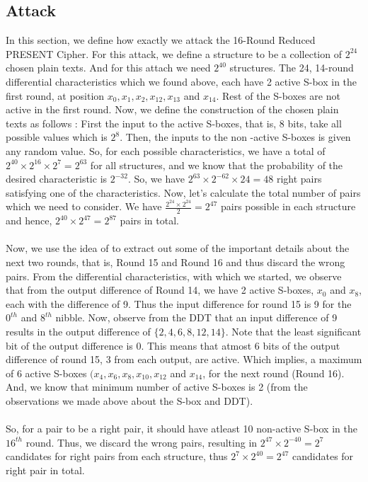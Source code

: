 \documentclass[preprint]{transcrypto}
\begin{document}
\subsection{Attack}
In this section, we define how exactly we attack the 16-Round Reduced PRESENT Cipher. For this attack, we define a structure to be a collection of $2^{24}$ chosen plain texts. And for this attach we need $2^{40}$ structures. The 24, 14-round differential characteristics which we found above, each have 2 active S-box in the first round, at position $x_0,x_1,x_2,x_{12},x_{13}$ and $x_{14}$. Rest of the S-boxes are not active in the first round. Now, we define the construction of the chosen plain texts as follows : First the input to the active S-boxes, that is, 8 bits, take all possible values which is $2^8$. Then, the inputs to the non -active S-boxes is given any random value. So, for each possible characteristics, we have a total of $2^{40}\times2^{16}\times2^7 = 2^{63}$ for all structures, and we know that the probability of the desired characteristic is $2^{-32}$. So, we have $2^{63} \times 2^{-62} \times 24 = 48$ right pairs satisfying one of the characteristics. Now, let's calculate the total number of pairs which we need to consider. We have $\frac{2^{24} \times 2^{24}}{2} = 2^{47}$ pairs possible in each structure and hence, $2^{40} \times 2^{47} = 2^{87}$ pairs in total. \\ \\ 
Now, we use the idea of  to extract out some of the important details about the next two rounds, that is, Round 15 and Round 16 and thus discard the wrong pairs. From the differential characteristics, with which we started, we observe that from the output difference of Round 14, we have 2 active S-boxes, $x_0$ and $x_{8}$, each with the difference of 9. Thus the input difference for round 15 is 9 for the $0^{th}$ and $8^{th}$ nibble. Now, observe from the DDT that an input difference of 9 results in the output difference of $\{2,4,6,8,12,14\}$. Note that the least significant bit of the output difference is 0. This means that atmost 6 bits of the output difference of round 15, 3 from each output, are active. Which implies, a maximum of 6 active S-boxes $(x_4, x_6, x_8, x_{10}, x_{12}$ and $x_{14}$, for the next round (Round 16). And, we know that minimum number of active S-boxes is 2 (from the observations we made above about the S-box and DDT). \\ \\
So, for a pair to be a right pair, it should have atleast 10 non-active S-box in the $16^{th}$ round. Thus, we discard the wrong pairs, resulting in $2^{47} \times 2^{-40} = 2^7$ candidates for right pairs from each structure, thus $2^7 \times 2^{40} = 2^{47}$ candidates for right pair in total. \\ \\
\end{document}
